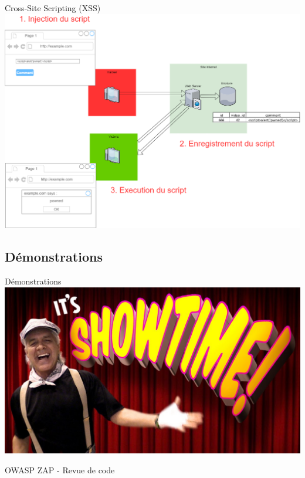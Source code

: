 \documentclass{beamer}
\begin{document}
\begin{frame}{Cross-Site Scripting (XSS)}
\centering
\includegraphics[width=0.92\paperwidth ]{schemas/images/XSS.png}
\end{frame}
\subsection{Démonstrations}
\begin{frame}{Démonstrations}
\centering
\includegraphics[width=0.92\paperwidth ]{schemas/images/showtime.jpg}
\end{frame}

\begin{frame}{OWASP ZAP - Revue de code}

\begin{center}
	
\end{center} 

\end{frame}
\end{document}
